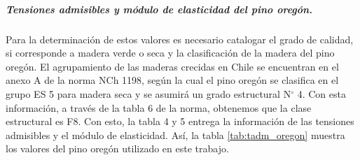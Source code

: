 \begin{table}[h]
\centering
{}
\caption{Valores de la densidad normal y anhidra del pino oregón. $^{\dagger}$: Definido con el percentil 5\% de exclusión. \cite{nch1198}}
\label{tab:densidad_oregon}
\end{table}

\subparagraph{Tensiones admisibles y módulo de elasticidad del pino oregón.}
Para la determinación de estos valores es necesario catalogar el grado de calidad, si corresponde a madera verde o seca y la clasificación de la madera del pino oregón. El agrupamiento de las maderas crecidas en Chile se encuentran en el anexo A de la norma NCh 1198, según la cual el pino oregón se clasifica en el grupo ES 5 para madera seca y se asumirá un grado estructural N$^{\circ}$ 4. Con esta información, a través de la tabla 6 de la norma, obtenemos que la clase estructural es F8. Con esto, la tabla 4 y 5 entrega la información de las tensiones admisibles y el módulo de elasticidad. Así, la tabla \ref{tab:tadm_oregon} muestra los valores del pino oregón utilizado en este trabajo.

